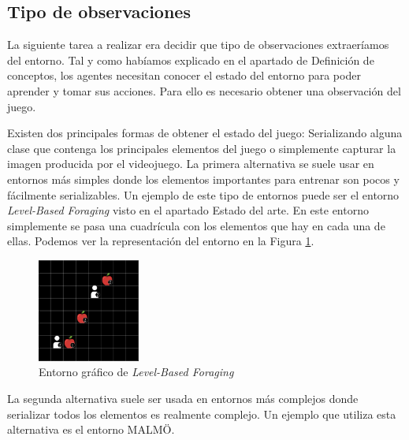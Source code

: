 \subsection{Tipo de observaciones}
La siguiente tarea a realizar era decidir que tipo de observaciones extraeríamos del entorno. Tal y como habíamos explicado en el apartado de Definición de conceptos, los agentes necesitan conocer el estado del entorno para poder aprender y tomar sus acciones. Para ello es necesario obtener una observación del juego. 

Existen dos principales formas de obtener el estado del juego: Serializando alguna clase que contenga los principales elementos del juego o simplemente capturar la imagen producida por el videojuego. La primera alternativa se suele usar en entornos más simples donde los elementos importantes para entrenar son pocos y fácilmente serializables. Un ejemplo de este tipo de entornos puede ser el entorno \textit{Level-Based Foraging} visto en el apartado Estado del arte. En este entorno simplemente se pasa una cuadrícula con los elementos que hay en cada una de ellas. Podemos ver la representación del entorno en la Figura \ref {fig:foraging-2}.
\begin{figure}[h]
    \centering
    \includegraphics[width=0.3\textwidth]{img/level-base.png}
    \caption{Entorno gráfico de \textit{Level-Based Foraging} \cite {env-list}}
    \label{fig:foraging-2}
\end{figure}

La segunda alternativa suele ser usada en entornos más complejos donde serializar todos los elementos es realmente complejo. Un ejemplo que utiliza esta alternativa es el entorno MALMÖ.

